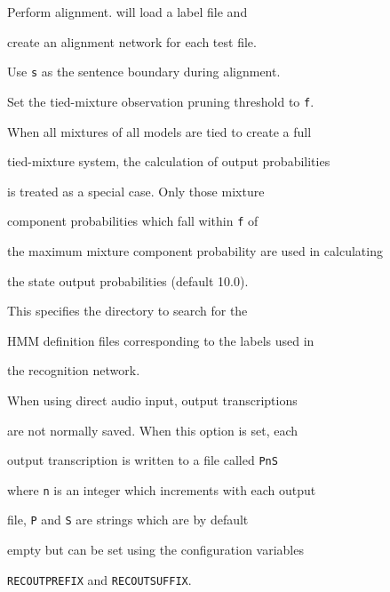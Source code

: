 \begin{optlist}





   Perform alignment.   will load a label file and


        create an alignment network for each test file.





   Use \texttt{s} as the sentence boundary during alignment.


  


   Set the tied-mixture observation pruning threshold to \texttt{f}.


        When all mixtures of all models are tied to create a full


        tied-mixture system, the calculation of output probabilities


        is treated as a special case.  Only those mixture 


        component probabilities which fall within \texttt{f} of


        the maximum mixture component probability are used in calculating


        the state output probabilities (default 10.0).





   This specifies the directory to search for the


        HMM definition files corresponding to the labels used in


        the recognition network.


   When using direct audio input, output transcriptions


        are not normally saved.  When this option is set, each


        output transcription is written to a file called \texttt{PnS}


        where \texttt{n} is an integer which increments with each output


        file, \texttt{P} and \texttt{S} are strings which are by default


        empty but can be set using the configuration variables


        \texttt{RECOUTPREFIX} and \texttt{RECOUTSUFFIX}.






\end{optlist}
